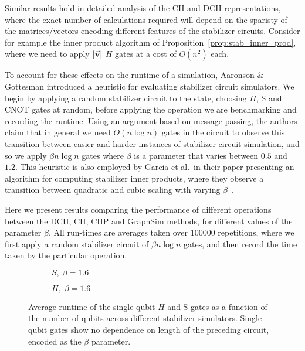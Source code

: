 Similar results hold in detailed analysis of the CH and DCH representations, where the exact number of calculations required will depend on the sparisty of the matrices/vectors encoding different features of the stabilizer circuits. Consider for example the inner product algorithm of Proposition~\ref{prop:stab_inner_prod}, where we need to apply $\vert \va{v}\vert$ $H$ gates at a cost of $O(n^{2})$ each.\par
To account for these effects on the runtime of a simulation, Aaronson \& Gottesman introduced a heuristic for evaluating stabilizer circuit simulators. We begin by applying a random stabilizer circuit to the state, choosing $H$, S and CNOT gates at random, before applying the operation we are benchmarking and recording the runtime. Using an argument based on message passing, the authors claim that in general we need $O(n\log{n})$ gates in the circuit to observe this transition between easier and harder instances of stabilizer circuit simulation, and so we apply $\beta n\log{n}$ gates where $\beta$ is a parameter that varies between $0.5$ and $1.2$. This heuristic is also employed by Garcia et al.\ in their paper presenting an algorithm for computing stabilizer inner products, where they observe a transition between quadratic and cubic scaling with varying $\beta$~\cite{Garcia2012}.\par
Here we present results comparing the performance of different operations between the DCH, CH, CHP and GraphSim methods, for different values of the parameter $\beta$. All run-times are averages taken over $100000$ repetitions, where we first apply a random stabilizer circuit of $\beta n\log{n}$ gates, and then record the time taken by the particular operation.\par
\begin{figure}[p]
\centering
\begin{subfigure}[t]{0.48\textwidth}
    \centering
    \caption{$S,\;\beta=1.6$}
    \begin{scaletikzpicturetowidth}{\textwidth}
        
    \end{scaletikzpicturetowidth}
\end{subfigure}
\begin{subfigure}[t]{0.48\textwidth}
    \centering
    \caption{$H,\;\beta=1.6$}
    \begin{scaletikzpicturetowidth}{\textwidth}
        
    \end{scaletikzpicturetowidth}
\end{subfigure}
\caption{Average runtime of the single qubit $H$ and S gates as a function of the number of qubits across different stabilizer simulators. Single qubit gates show no dependence on length of the preceding circuit, encoded as the $\beta$ parameter.}
\label{fig:single_qubit_clifford_timings}
\end{figure}
